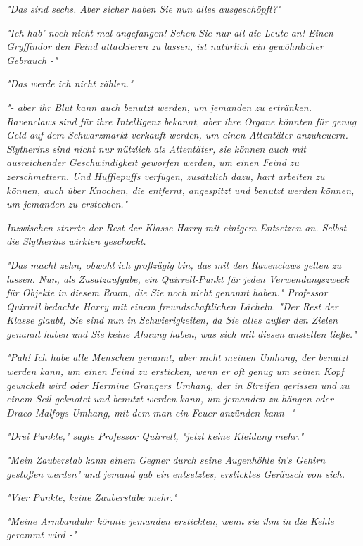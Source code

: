 {\emph{"Das sind sechs. Aber sicher haben Sie nun alles ausgeschöpft?"}

\emph{"Ich hab' noch nicht mal angefangen! Sehen Sie nur all die Leute an! Einen Gryffindor den Feind attackieren zu lassen, ist natürlich ein} \emph{\emph{gewöhnlicher}} \emph{Gebrauch -"}

\emph{"Das werde ich nicht zählen."}

\emph{"- aber ihr Blut kann auch benutzt werden, um jemanden zu ertränken. Ravenclaws sind für ihre Intelligenz bekannt, aber ihre Organe könnten für genug Geld auf dem Schwarzmarkt verkauft werden, um einen Attentäter anzuheuern. Slytherins sind nicht nur nützlich als Attentäter, sie können auch mit ausreichender Geschwindigkeit geworfen werden, um einen Feind zu zerschmettern. Und Hufflepuffs verfügen, zusätzlich dazu, hart arbeiten zu können, auch über Knochen, die entfernt, angespitzt und benutzt werden können, um jemanden zu erstechen."}

\emph{Inzwischen starrte der Rest der Klasse Harry mit einigem Entsetzen an. Selbst die Slytherins wirkten geschockt.}

\emph{"Das macht zehn, obwohl ich großzügig bin, das mit den Ravenclaws gelten zu lassen. Nun, als Zusatzaufgabe, ein Quirrell-Punkt für jeden Verwendungszweck für Objekte in diesem Raum, die Sie noch nicht genannt haben." Professor Quirrell bedachte Harry mit einem} \emph{freundschaftlichen Lächeln. "Der Rest der Klasse glaubt, Sie sind nun in Schwierigkeiten, da Sie alles außer den Zielen genannt haben und Sie keine Ahnung haben, was sich mit diesen anstellen ließe."}

\emph{"Pah! Ich habe alle Menschen genannt, aber nicht meinen Umhang, der benutzt werden kann, um einen Feind zu ersticken, wenn er oft genug um seinen Kopf gewickelt wird oder Hermine Grangers Umhang, der in Streifen gerissen und zu einem Seil geknotet und benutzt werden kann, um jemanden zu hängen oder Draco Malfoys Umhang, mit dem man ein Feuer anzünden kann -"}

\emph{"Drei Punkte," sagte Professor Quirrell, "jetzt keine Kleidung mehr."}

\emph{"Mein Zauberstab kann einem Gegner durch seine Augenhöhle in's Gehirn gestoßen werden" und jemand gab ein entsetztes, ersticktes Geräusch von sich.}

\emph{"Vier Punkte, keine Zauberstäbe mehr."}

\emph{"Meine Armbanduhr könnte jemanden erstickten, wenn sie ihm in die Kehle gerammt wird -"}

}
